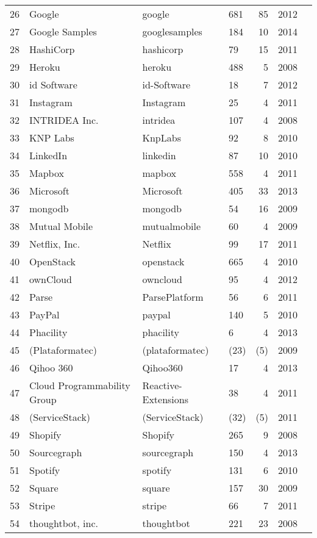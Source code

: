 \begin{longtable}{rlllrlr}
  26 & Google & google & 681 &  85 & 2012 \\
  27 & Google Samples & googlesamples & 184 &  10 & 2014 \\
  28 & HashiCorp & hashicorp &  79 &  15 & 2011 \\
  29 & Heroku & heroku & 488 &   5 & 2008 \\
  30 & id Software & id-Software &  18 &   7 & 2012 \\
  31 & Instagram & Instagram &  25 &   4 & 2011 \\
  32 & INTRIDEA Inc. & intridea & 107 &   4 & 2008 \\
  33 & KNP Labs & KnpLabs &  92 &   8 & 2010 \\
  34 & LinkedIn & linkedin &  87 &  10 & 2010 \\
  35 & Mapbox & mapbox & 558 &   4 & 2011 \\
  36 & Microsoft & Microsoft & 405 &  33 & 2013 \\
  37 & mongodb & mongodb &  54 &  16 & 2009 \\
  38 & Mutual Mobile & mutualmobile &  60 &   4 & 2009 \\
  39 & Netflix, Inc. & Netflix &  99 &  17 & 2011 \\
  40 & OpenStack & openstack & 665 &   4 & 2010 \\
  41 & ownCloud & owncloud &  95 &   4 & 2012 \\
  42 & Parse & ParsePlatform &  56 &   6 & 2011 \\
  43 & PayPal & paypal & 140 &   5 & 2010 \\
  44 & Phacility & phacility &   6 &   4 & 2013 \\
  45 & (Plataformatec) & (plataformatec) &  (23) &   (5) & 2009 \\
  46 & Qihoo 360 & Qihoo360 &  17 &   4 & 2013 \\
  47 & Cloud Programmability Group & Reactive-Extensions &  38 &   4 & 2011 \\
  48 & (ServiceStack) & (ServiceStack) &  (32) &   (5) & 2011 \\
  49 & Shopify & Shopify & 265 &   9 & 2008 \\
  50 & Sourcegraph & sourcegraph & 150 &   4 & 2013 \\
  51 & Spotify & spotify & 131 &   6 & 2010 \\
  52 & Square & square & 157 &  30 & 2009 \\
  53 & Stripe & stripe &  66 &   7 & 2011 \\
  54 & thoughtbot, inc. & thoughtbot & 221 &  23 & 2008 \\

\end{longtable}
